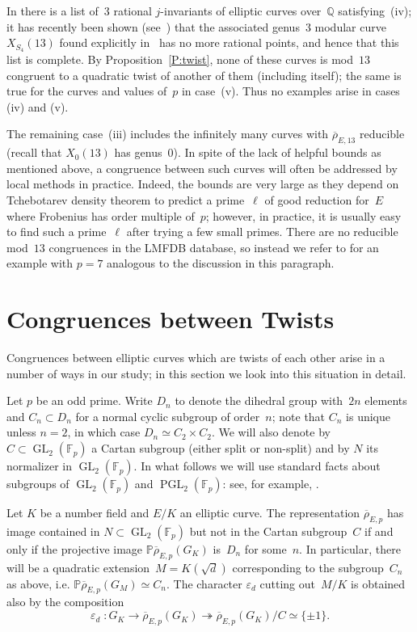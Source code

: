 \documentclass[12pt]{amsart}
\newcommand{\F}{\mathbb{F}}
\newcommand{\PP}{\mathbb{P}}
\newcommand{\Q}{\mathbb{Q}}
\newcommand{\rhobar}{{\overline{\rho}}}
\newcommand{\eps}{\varepsilon}
\newcommand{\GL}{\operatorname{GL}}
\newcommand{\PGL}{\operatorname{PGL}}
\numberwithin{equation}{section}
\theoremstyle{definition}
\theoremstyle{remark}
\begin{document}
In \cite[Corollary~1.9]{BarinderCrem} there is a list of~$3$ rational
$j$-invariants of elliptic curves over~$\Q$ satisfying~(iv); it has
recently been shown (see~\cite{BDMTV-S4}) that the associated
genus~$3$ modular curve~$X_{S_4}(13)$ found explicitly
in~\cite{BarinderCrem} has no more rational points, and hence that
this list is complete. By Proposition~\ref{P:twist}, none of these
curves is mod~$13$ congruent to a quadratic twist of another of them
(including itself); the same is true for the curves and values of~$p$
in case~(v). Thus no examples arise in cases (iv) and (v).

The remaining case~(iii) includes the infinitely many curves with
$\rhobar_{E,13}$ reducible (recall that $X_0(13)$ has genus~0). In
spite of the lack of helpful bounds as mentioned above, a congruence
between such curves will often be addressed by local methods in
practice. Indeed, the bounds are very large as they depend on
Tchebotarev density theorem to predict a prime~$\ell$ of good
reduction for~$E$ where Frobenius has order multiple of~$p$; however,
in practice, it is usually easy to find such a prime~$\ell$ after
trying a few small primes.  There are no reducible mod~$13$ congruences in the LMFDB database, so instead we refer to \cite[Example~31.2]{FKSym} for
an example with $p=7$ analogous to the discussion in this paragraph.

\section{Congruences between Twists}

Congruences between elliptic curves which are twists of each other arise in a number of ways in our study; in this section we look into this situation in detail.

Let $p$ be an odd prime. Write $D_{n}$ to denote the dihedral group
with~$2n$ elements and $C_n \subset D_{n}$ for a normal cyclic
subgroup of order~$n$; note that $C_n$ is unique unless $n=2$, in
which case $D_{n} \simeq C_2 \times C_2$.  We will also denote by $C
\subset \GL_2(\F_p)$ a Cartan subgroup (either split or non-split) and
by $N$ its normalizer in $\GL_2(\F_p)$.  In what follows we will use
standard facts about subgroups of $\GL_2(\F_p)$ and $\PGL_2(\F_p)$:
see, for example, \cite[Theorem XI.2.3]{LangModForms}.

Let $K$ be a number field and $E/K$ an elliptic curve. The representation $\rhobar_{E,p}$ has image contained in $N \subset \GL_2(\F_p)$ but not in the Cartan subgroup~$C$ 
if and only if the projective image 
$\PP \rhobar_{E,p}(G_K)$ is~$D_{n}$ for some~$n$. In particular, there will be a quadratic extension~$M = K(\sqrt{d})$ corresponding to the subgroup~$C_n$ as above, i.e. $\PP \rhobar_{E,p}(G_M) \simeq C_n$. The character $\eps_d$ cutting out~$M/K$ is obtained also by the composition
\[
 \eps_d \; : G_K \to \rhobar_{E,p}(G_K) \twoheadrightarrow \rhobar_{E,p}(G_K)/C \simeq \{\pm 1 \}.
\]
\end{document}
